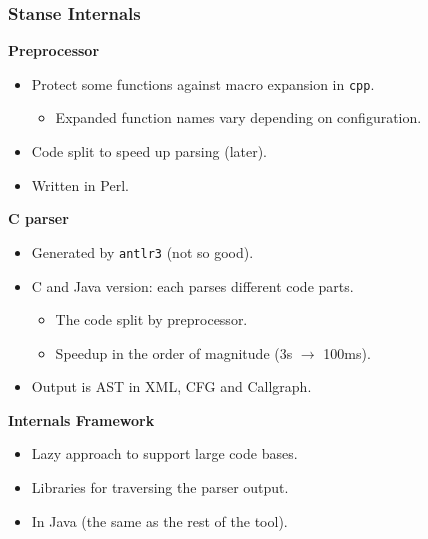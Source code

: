 \documentclass[xcolor=dvipsnames]{beamer}
\newcommand{\heading}[1]{\textbf{\textcolor{BurntOrange}{#1}}}
\begin{document}
\begin{frame}
  \frametitle{Stanse Internals}
  \heading{Preprocessor}
  \begin{itemize}
  \item Protect some functions against macro expansion in \texttt{cpp}.
    \begin{itemize}
    \item Expanded function names vary depending on configuration.
    \end{itemize}
  \item Code split to speed up parsing (later).
  \item Written in Perl.
  \end{itemize}

  \pause

  \heading{C parser}
  \begin{itemize}
  \item Generated by \texttt{antlr3} (not so good).
  \item C and Java version: each parses different code parts.
    \begin{itemize}
    \item The code split by preprocessor.
    \item Speedup in the order of magnitude (3s $\rightarrow$ 100ms).
    \end{itemize}
  \item Output is AST in XML, CFG and Callgraph.
  \end{itemize}

  \pause

  \heading{Internals Framework}
  \begin{itemize}
  \item Lazy approach to support large code bases.
  \item Libraries for traversing the parser output.
  \item In Java (the same as the rest of the tool).
  \end{itemize}

\end{frame}
\end{document}
